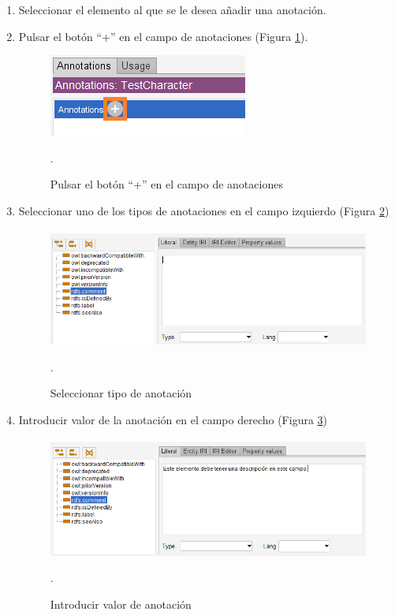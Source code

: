 \begin{enumerate}
    \item Seleccionar el elemento al que se le desea añadir una anotación.
    \item Pulsar el botón “+” en el campo de anotaciones (Figura \ref*{annotation_1}).
    \begin{figure}[H]
        \centering
        \includegraphics[scale=0.6]{Figures/Protege/Annotations.png}
        \caption{Pulsar el botón “+” en el campo de anotaciones}.
        \label{annotation_1}
    \end{figure}

    \item Seleccionar uno de los tipos de anotaciones en el campo izquierdo (Figura \ref*{annotation_2})
    \begin{figure}[H]
        \centering
        \includegraphics[scale=0.6]{Figures/Protege/Annotations_1.png}
        \caption{Seleccionar tipo de anotación}.
        \label{annotation_2}
    \end{figure}

    \item Introducir valor de la anotación en el campo derecho (Figura \ref*{annotation_3})
    \begin{figure}[H]
        \centering
        \includegraphics[scale=0.6]{Figures/Protege/Annotations_2.png}
        \caption{Introducir valor de anotación}.
        \label{annotation_3}
    \end{figure}


\end{enumerate}
